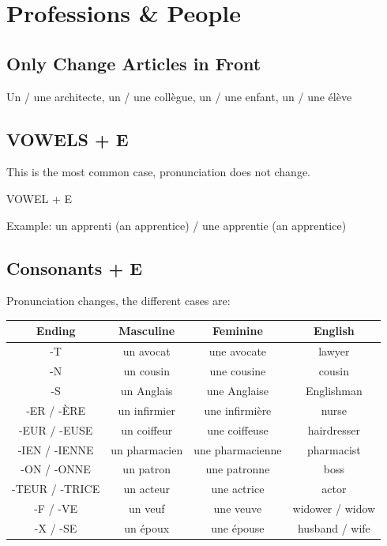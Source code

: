 \documentclass{book}
\begin{document}
    \section{Professions \& People}
        \subsection{Only Change Articles in Front}
            Un / une architecte, un / une collègue, un / une enfant, un / une élève 
        \subsection{VOWELS + E}
            This is the most common case, pronunciation does not change.
            \begin{center}
                VOWEL + E
            \end{center}
            Example: un apprenti (an apprentice) / une apprentie (an apprentice)
        \subsection{Consonants + E}
            Pronunciation changes, the different cases are:
            \begin{center}
                \begin{tabular}{|c|c|c|c|}
                    \hline
                    \textbf{Ending} & \textbf{Masculine} & \textbf{Feminine} & \textbf{English}\\
                    \hline
                    -T & un avocat & une avocate & lawyer\\
                    \hline
                    -N & un cousin & une cousine & cousin\\
                    \hline
                    -S & un Anglais & une Anglaise & Englishman \\
                    \hline
                    -ER / -ÈRE & un infirmier & une infirmière & nurse \\
                    \hline
                    -EUR / -EUSE & un coiffeur & une coiffeuse & hairdresser\\
                    \hline
                    -IEN / -IENNE & un pharmacien & une pharmacienne & pharmacist\\
                    \hline
                    -ON / -ONNE & un patron & une patronne & boss\\
                    \hline
                    -TEUR / -TRICE & un acteur & une actrice & actor\\
                    \hline
                    -F / -VE & un veuf & une veuve & widower / widow\\
                    \hline
                    -X / -SE & un époux & une épouse & husband / wife\\
                    \hline
                \end{tabular}
            \end{center}
        
\end{document}
